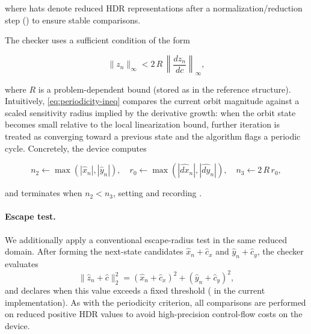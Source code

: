 where hats denote reduced HDR representations after a normalization/reduction
step () to ensure stable comparisons.

The checker uses a sufficient condition of the form

\begin{equation}
  \lVert z_n\rVert_\infty < 2\,R\,\left\lVert\frac{dz_n}{dc}\right\rVert_\infty,
  \label{eq:periodicity-ineq}
\end{equation}

where \(R\) is a problem-dependent bound (stored as  in the
reference structure). Intuitively, \eqref{eq:periodicity-ineq} compares the
current orbit magnitude against a scaled sensitivity radius implied by the
derivative growth: when the orbit state becomes small relative to the local
linearization bound, further iteration is treated as converging toward a
previous state and the algorithm flags a periodic cycle.
Concretely, the device computes

\begin{equation}
  n_2 \leftarrow \max(|\widehat{x}_n|, |\widehat{y}_n|), \quad
  r_0 \leftarrow \max(|\widehat{d x}_n|, |\widehat{d y}_n|), \quad
  n_3 \leftarrow 2\,R\,r_0,
  \label{eq:gpu-periodicity-vars}
\end{equation}

and terminates when \(n_2 < n_3\), setting  and recording .

\paragraph{Escape test.}
We additionally apply a conventional escape-radius test in the same reduced
domain. After forming the next-state candidates
\(
\widehat{x}_n + \widehat{c}_x
\)
and
\(
\widehat{y}_n + \widehat{c}_y
\),
the checker evaluates
\begin{equation}
  \lVert\widehat{z}_n + \widehat{c}\rVert_2^2
  = (\widehat{x}_n + \widehat{c}_x)^2 + (\widehat{y}_n + \widehat{c}_y)^2,
  \label{eq:gpu-escape-norm}
\end{equation}
and declares  when this value exceeds a fixed threshold
( in the current implementation). As with the periodicity
criterion, all comparisons are performed on reduced positive HDR values to avoid
high-precision control-flow costs on the device.

